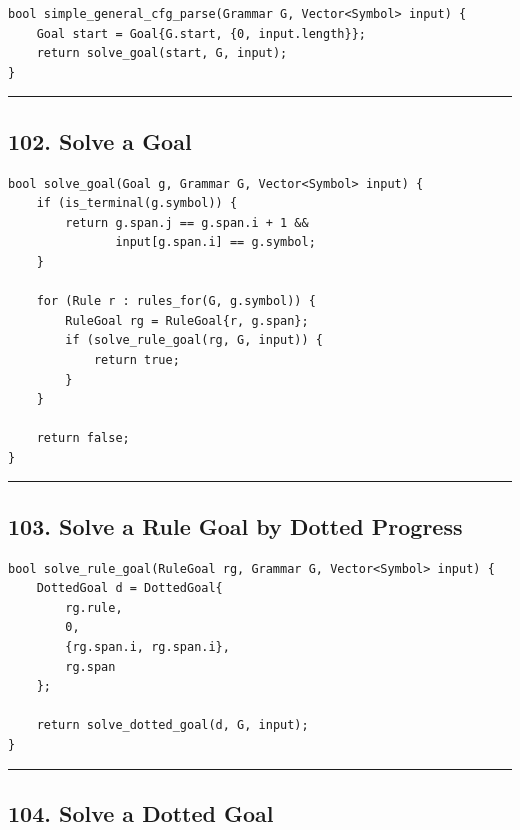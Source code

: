 \documentclass[10pt,letterpaper]{article}
\begin{document}
\begin{verbatim}
bool simple_general_cfg_parse(Grammar G, Vector<Symbol> input) {
    Goal start = Goal{G.start, {0, input.length}};
    return solve_goal(start, G, input);
}
\end{verbatim}

\medskip\hrule\medskip

\subsection*{102. Solve a Goal}

\begin{verbatim}
bool solve_goal(Goal g, Grammar G, Vector<Symbol> input) {
    if (is_terminal(g.symbol)) {
        return g.span.j == g.span.i + 1 &&
               input[g.span.i] == g.symbol;
    }

    for (Rule r : rules_for(G, g.symbol)) {
        RuleGoal rg = RuleGoal{r, g.span};
        if (solve_rule_goal(rg, G, input)) {
            return true;
        }
    }

    return false;
}
\end{verbatim}

\medskip\hrule\medskip

\subsection*{103. Solve a Rule Goal by Dotted Progress}

\begin{verbatim}
bool solve_rule_goal(RuleGoal rg, Grammar G, Vector<Symbol> input) {
    DottedGoal d = DottedGoal{
        rg.rule,
        0,
        {rg.span.i, rg.span.i},
        rg.span
    };

    return solve_dotted_goal(d, G, input);
}
\end{verbatim}

\medskip\hrule\medskip

\subsection*{104. Solve a Dotted Goal}
\end{document}
